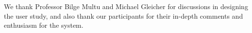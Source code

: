 \documentclass{sigchi}
\begin{document}
We thank Professor Bilge Multu and Michael Gleicher for discussions in designing the user study, and also thank our participants for their in-depth comments and enthusiasm for the system.  

%
%
%
%
%
\balance



\end{document}
